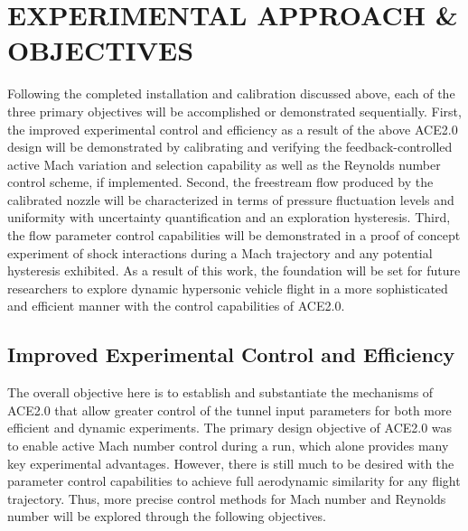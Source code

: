 %
%  
%


\chapter{EXPERIMENTAL APPROACH \& OBJECTIVES}

Following the completed installation and calibration discussed above, each of the three primary objectives will be accomplished or demonstrated sequentially. First, the improved experimental control and efficiency as a result of the above ACE2.0 design will be demonstrated by calibrating and verifying the feedback-controlled active Mach variation and selection capability as well as the Reynolds number control scheme, if implemented. Second, the freestream flow produced by the calibrated nozzle will be characterized in terms of pressure fluctuation levels and uniformity with uncertainty quantification and an exploration hysteresis. Third, the flow parameter control capabilities will be demonstrated in a proof of concept experiment of shock interactions during a Mach trajectory and any potential hysteresis exhibited. As a result of this work, the foundation will be set for future researchers to explore dynamic hypersonic vehicle flight in a more sophisticated and efficient manner with the control capabilities of ACE2.0.

\section{Improved Experimental Control and Efficiency} 

The overall objective here is to establish and substantiate the mechanisms of ACE2.0 that allow greater control of the tunnel input parameters for both more efficient and dynamic experiments. The primary design objective of ACE2.0 was to enable active Mach number control during a run, which alone provides many key experimental advantages. However, there is still much to be desired with the parameter control capabilities to achieve full aerodynamic similarity for any flight trajectory. Thus, more precise control methods for Mach number and Reynolds number will be explored through the following objectives.

